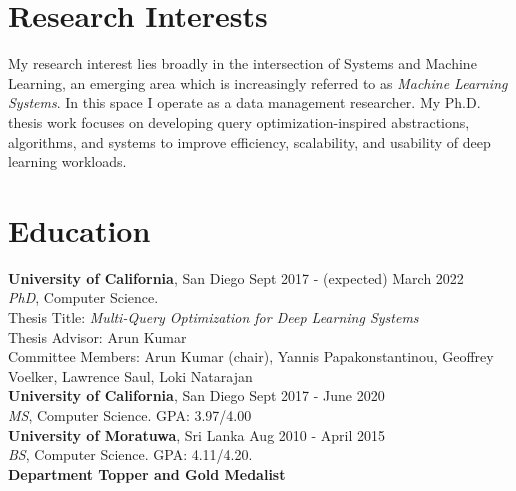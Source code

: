 \documentclass[margin]{res}
\begin{document}

\address{Phone: (+1) 812-558-6888\\ Email: snakanda@eng.ucsd.edu\\ Web: \href{https://scnakandala.github.io}{https://scnakandala.github.io}}
\address{3232 EBU3B CSE\\9500 Gilman Drive\\La Jolla, CA 92093}


\begin{resume}
\vspace{-2mm}
\section{Research Interests}
My research interest lies broadly in the intersection of Systems and Machine Learning, an emerging area which is increasingly referred to as \textit{Machine Learning Systems}. In this space I operate as a data management researcher. My Ph.D. thesis work focuses on developing query optimization-inspired abstractions, algorithms, and systems to improve efficiency, scalability, and usability of deep learning workloads.


\section{Education}
\textbf{University of California}, San Diego \hfill Sept 2017 - (expected) March 2022\\ 
{\sl PhD}, Computer Science.\\
Thesis Title: \textit{Multi-Query Optimization for Deep Learning Systems}\\
\quad Thesis Advisor: Arun Kumar\\
\quad Committee Members: Arun Kumar (chair), Yannis Papakonstantinou, Geoffrey Voelker, Lawrence Saul, Loki Natarajan\\

\vspace{-5mm}
\textbf{University of California}, San Diego \hfill Sept 2017 - June 2020\\
{\sl MS}, Computer Science. GPA: 3.97/4.00\\

\vspace{-5mm}
\textbf{University of Moratuwa}, Sri Lanka \hfill Aug 2010 - April 2015\\
{\sl BS}, Computer Science. GPA: 4.11/4.20.\\
\textbf{Department Topper and Gold Medalist}\\



\end{resume}
\end{document}
